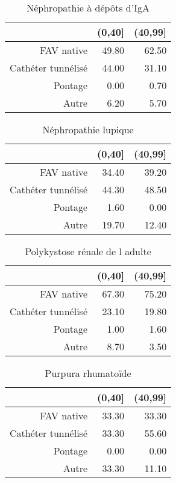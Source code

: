 \documentclass[11pt,a4paper]{article}\usepackage[]{graphicx}\usepackage[]{color}
\begin{document}
\begin{multicols}{2}
\begin{table}[H]
\centering
\begin{tabular}{rrr}
  \hline
 & (0,40] & (40,99] \\ 
  \hline
FAV native & 49.80 & 62.50 \\ 
  Cathéter tunnélisé & 44.00 & 31.10 \\ 
  Pontage & 0.00 & 0.70 \\ 
  Autre & 6.20 & 5.70 \\ 
   \hline
\end{tabular}
\caption{Néphropathie à dépôts d'IgA} 
\end{table}
\begin{table}[H]
\centering
\begin{tabular}{rrr}
  \hline
 & (0,40] & (40,99] \\ 
  \hline
FAV native & 34.40 & 39.20 \\ 
  Cathéter tunnélisé & 44.30 & 48.50 \\ 
  Pontage & 1.60 & 0.00 \\ 
  Autre & 19.70 & 12.40 \\ 
   \hline
\end{tabular}
\caption{Néphropathie lupique} 
\end{table}
\begin{table}[H]
\centering
\begin{tabular}{rrr}
  \hline
 & (0,40] & (40,99] \\ 
  \hline
FAV native & 67.30 & 75.20 \\ 
  Cathéter tunnélisé & 23.10 & 19.80 \\ 
  Pontage & 1.00 & 1.60 \\ 
  Autre & 8.70 & 3.50 \\ 
   \hline
\end{tabular}
\caption{Polykystose rénale de l adulte} 
\end{table}
\begin{table}[H]
\centering
\begin{tabular}{rrr}
  \hline
 & (0,40] & (40,99] \\ 
  \hline
FAV native & 33.30 & 33.30 \\ 
  Cathéter tunnélisé & 33.30 & 55.60 \\ 
  Pontage & 0.00 & 0.00 \\ 
  Autre & 33.30 & 11.10 \\ 
   \hline
\end{tabular}
\caption{Purpura rhumatoïde} 
\end{table}

\end{multicols}
\end{document}
